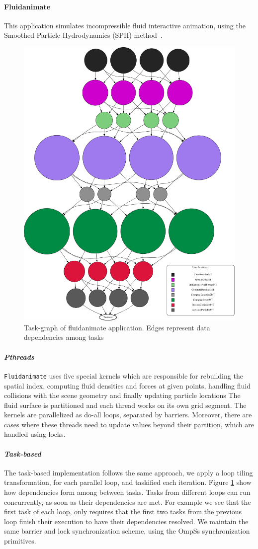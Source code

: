 {\paragraph{\textbf{Fluidanimate}}
This application simulates incompressible fluid interactive animation, using the 
Smoothed Particle Hydrodynamics (SPH) method~\cite{Muller:2003:PFS:846276.846298}.

\begin{figure}[t!]%
	\center
	\includegraphics[width=.6\columnwidth]{ifcg/figures/fluidanimate_taskgraph}%
	\caption{Task-graph of fluidanimate application. Edges represent data dependencies among
tasks}
	\label{fig:fluidanimate_tg}%
	\vspace{.5cm}
\end{figure}

\paragraph{\textit{Pthreads}}
\texttt{Fluidanimate} uses five special kernels which are responsible for rebuilding the
spatial index, computing fluid densities and forces at given points, handling fluid
collisions with the scene geometry and finally updating particle locations The fluid
surface is partitioned and each thread works on its own grid segment.  The kernels are
parallelized as do-all loops, separated by barriers. Moreover, there are cases where these
threads need to update values beyond their partition, which are handled using locks.

\paragraph{\textit{Task-based}}
The task-based implementation follows the same approach, we apply a loop tiling
transformation, for each parallel loop, and taskified each iteration.  
Figure \ref{fig:fluidanimate_tg} show how dependencies form among between tasks.  
Tasks from different loops can run concurrently, as soon as their dependencies are met.
For example we see that the first task of each loop, only requires that the first two tasks
from the previous loop finish their execution to have their dependencies resolved.
We maintain the
same barrier and lock synchronization scheme, using the OmpSs synchronization primitives.

}
